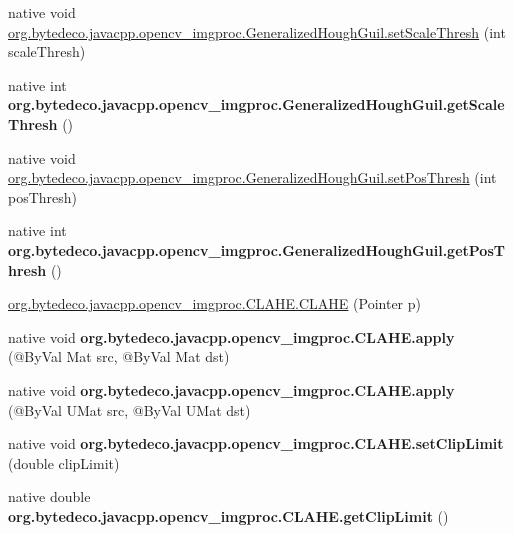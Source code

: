 \begin{DoxyCompactItemize}
\item 
native void \hyperlink{group__imgproc_ga09e4c27dd4351588315bc5b3fe754a7f}{org.\+bytedeco.\+javacpp.\+opencv\+\_\+imgproc.\+Generalized\+Hough\+Guil.\+set\+Scale\+Thresh} (int scale\+Thresh)
\item 
\mbox{\label{group__imgproc_gaf69c388a9eb70ceb71f56299c07440b1}} 
native int {\bfseries org.\+bytedeco.\+javacpp.\+opencv\+\_\+imgproc.\+Generalized\+Hough\+Guil.\+get\+Scale\+Thresh} ()
\item 
native void \hyperlink{group__imgproc_ga5c699f44c50f521fee2c6103fe9686a4}{org.\+bytedeco.\+javacpp.\+opencv\+\_\+imgproc.\+Generalized\+Hough\+Guil.\+set\+Pos\+Thresh} (int pos\+Thresh)
\item 
\mbox{\label{group__imgproc_ga51015d97daa421ac7162c18d76a8ddba}} 
native int {\bfseries org.\+bytedeco.\+javacpp.\+opencv\+\_\+imgproc.\+Generalized\+Hough\+Guil.\+get\+Pos\+Thresh} ()
\item 
\hyperlink{group__imgproc_ga088af9aa661b76b4381a4635c06ec8c8}{org.\+bytedeco.\+javacpp.\+opencv\+\_\+imgproc.\+C\+L\+A\+H\+E.\+C\+L\+A\+HE} (Pointer p)
\item 
\mbox{\label{group__imgproc_gad4d7e44b2ae58f719133df9466961fa6}} 
native void {\bfseries org.\+bytedeco.\+javacpp.\+opencv\+\_\+imgproc.\+C\+L\+A\+H\+E.\+apply} (@By\+Val Mat src, @By\+Val Mat dst)
\item 
\mbox{\label{group__imgproc_ga0f3d8b485b63c69219686b665045c741}} 
native void {\bfseries org.\+bytedeco.\+javacpp.\+opencv\+\_\+imgproc.\+C\+L\+A\+H\+E.\+apply} (@By\+Val U\+Mat src, @By\+Val U\+Mat dst)
\item 
\mbox{\label{group__imgproc_ga92c10fd0caca24a83a7a9cba63a25504}} 
native void {\bfseries org.\+bytedeco.\+javacpp.\+opencv\+\_\+imgproc.\+C\+L\+A\+H\+E.\+set\+Clip\+Limit} (double clip\+Limit)
\item 
\mbox{\label{group__imgproc_gad3edfaff410d65e264cf2e596f4028a6}} 
native double {\bfseries org.\+bytedeco.\+javacpp.\+opencv\+\_\+imgproc.\+C\+L\+A\+H\+E.\+get\+Clip\+Limit} ()
\item 
\mbox{\label{group__imgproc_gac0c8c765edb4040e1def1ebc139de087}} 

\end{DoxyCompactItemize}
